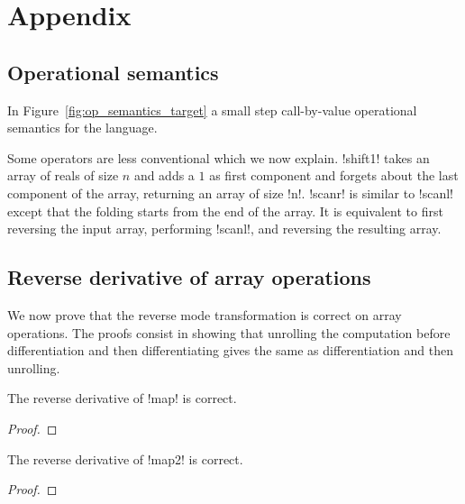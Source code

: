 \section{Appendix}

 \subsection{Operational semantics}

In Figure~\ref{fig:op_semantics_target} a small step call-by-value operational semantics for the language. 

Some operators are less conventional which we now explain.
!shift1! takes an array of reals of size $n$ and adds a $1$ as first component and forgets about the last component of the array, returning an array of size !n!.
!scanr! is similar to !scanl! except that the folding starts from the end of the array. 
It is equivalent to first reversing the input array, performing !scanl!, and reversing the resulting array.





 \subsection{Reverse derivative of array operations}

We now prove that the reverse mode transformation is correct on array operations. 
The proofs consist in showing that unrolling the computation before differentiation 
and then differentiating gives the same as differentiation and then unrolling. 

 \begin{proposition}
     The reverse derivative of !map! is correct.
 \end{proposition}

\begin{proof}
    
\end{proof}

 \begin{proposition}
    The reverse derivative of !map2! is correct.
\end{proposition}

\begin{proof}
    
\end{proof}

